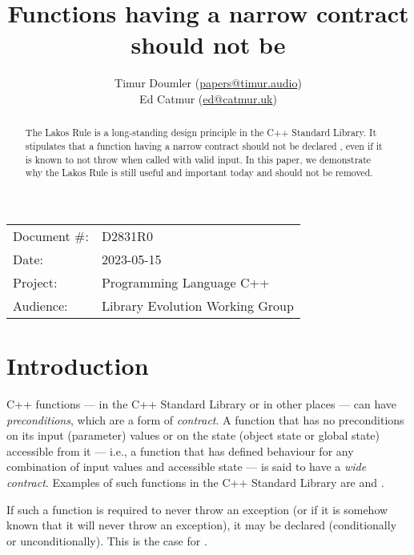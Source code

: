 


\title{Functions having a narrow contract should not be }
\author{ Timur Doumler \small(\href{mailto:papers@timur.audio}{papers@timur.audio})   \\
Ed Catmur \small(\href{mailto:ed@catmur.uk}{ed@catmur.uk})  }
\date{}
\maketitle

\begin{tabular}{ll}
Document \#: & D2831R0 \\
Date: &2023-05-15 \\
Project: & Programming Language C++ \\
Audience: & Library Evolution Working Group
\end{tabular}

\begin{abstract}
The Lakos Rule is a long-standing design principle in the C++ Standard Library. It stipulates that a function having a narrow contract should not be declared , even if it is known to not throw when called with valid input. In this paper, we demonstrate why the Lakos Rule is still useful and important today and should not be removed.
\end{abstract}

\section{Introduction}
\label{sec:intro}

C++ functions --- in the C++ Standard Library or in other places --- can have \emph{preconditions}, which are a form of \emph{contract}. A function that has no preconditions on its input (parameter) values or on the state (object state or global state) accessible from it --- i.e., a function that has defined behaviour for any combination of input values and accessible state --- is said to have a \emph{wide contract}. Examples of such functions in the C++ Standard Library are  and .

If such a function is required to never throw an exception (or if it is somehow known that it will never throw an exception), it may be declared  (conditionally or unconditionally). This is the case for .

